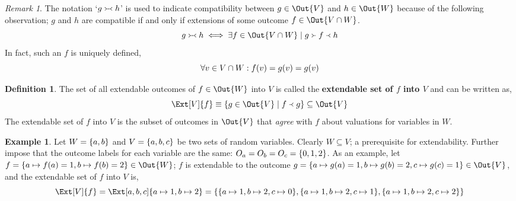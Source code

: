 \documentclass[aps, 10pt, english, twoside, pra, nofootinbib, longbibliography]{revtex4-1}
\theoremstyle{plain}
\theoremstyle{definition}
\newtheorem{definition}[theorem]{Definition}
\newtheorem{example}[theorem]{Example}
\theoremstyle{remark}
\newtheorem{remark}[theorem]{Remark}
\newcommand{\com}{\mathrel{\Yright\hspace{-0.2em}\Yleft}}
\newcommand{\ext}{\mathrel{\Yleft}}
\newcommand{\res}{\mathrel{\Yright}}
\newcommand{\term}[1]{\textcolor{Mahogany}{\textbf{#1}}}
\newcommand{\outc}[1]{o\bs{#1}} %
\begin{document}
    \begin{remark}
        The notation `$g \com h$' is used to indicate compatibility between $g \in \Out{V}$ and $h \in \Out{W}$ because of the following observation; $g$ and $h$ are compatible if and only if extensions of some outcome $f \in \Out{V \cap W}$.
        \[ g \com h \iff \exists f \in \Out{V \cap W} \mid g \res f \ext h \]
        In fact, such an $f$ is uniquely defined,
        \[ \forall v \in V \cap W : f\br{v} = g\br{v} = g\br{v} \]
    \end{remark}

    \begin{definition}
        \label{def:extendable_set}
        The set of all extendable outcomes of $f \in \Out{W}$ into $V$ is called the \term{extendable set of $f$ into $V$} and can be written as,
        \[ \Ext[V]{f} \defined \bc{g \in \Out{V} \mid f \ext g} \subseteq \Out{V} \]
        The extendable set of $f$ into $V$ is the subset of outcomes in $\Out{V}$ that \textit{agree} with $f$ about valuations for variables in $W$.
    \end{definition}


    \begin{example}
        Let $W = \bc{a, b}$ and $V = \bc{a, b, c}$ be two sets of random variables. Clearly $W \subseteq V$; a prerequisite for extendability. Further impose that the outcome labels for each variable are the same: $O_a = O_b = O_c = \bc{0,1,2}$. As an example, let $f = \bc{a \mapsto f\br{a} = 1, b \mapsto f\br{b} = 2} \in \Out{W}$; $f$ is extendable to the outcome $g = \bc{a \mapsto g\br{a} = 1, b \mapsto g\br{b} = 2, c \mapsto g\br{c} = 1} \in \Out{V}$, and the extendable set of $f$ into $V$ is,
        \[ \Ext[V]{f} = \Ext[a,b,c]{a \mapsto 1, b \mapsto 2} = \bc{\bc{a \mapsto 1, b \mapsto 2, c \mapsto 0}, \bc{a \mapsto 1, b \mapsto 2, c \mapsto 1}, \bc{a \mapsto 1, b \mapsto 2, c \mapsto 2}} \]
    \end{example}

\end{document}
